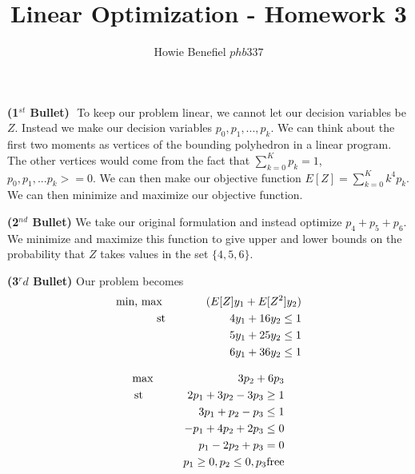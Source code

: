\documentclass[12pt]{article}
\newenvironment{problem}[2][Problem]{\begin{trivlist}
\item[\hskip \labelsep {\bfseries #1}\hskip \labelsep {\bfseries #2.}]}{\end{trivlist}}
\newenvironment{subproblem}[1]{\textbf{(#1)}}{}
\theoremstyle{definition}
\begin{document}

\title{Linear Optimization - Homework 3}
\author{Howie Benefiel \(phb337\)}
\maketitle

\begin{problem}{1}

\begin{subproblem}{1$^{st}$ Bullet}
$ $ \newline
To keep our problem linear, we cannot let our decision variables be  $Z$.
Instead we make our decision variables $p_0, p_1,...,p_k$.
We can think about the first two moments as vertices of the bounding polyhedron in a linear program.
The other vertices would come from the fact that $\sum^K_{k=0} p_k=1$, $p_0, p_1,...p_k >= 0$.
We can then make our objective function $E[Z]=\sum^K_{k=0} k^4p_k$.
We can then minimize and maximize our objective function.
\end{subproblem}

\begin{subproblem}{2$^{nd}$ Bullet}
We take our original formulation and instead optimize $p_4 + p_5 + p_6$.
We minimize and maximize this function to give upper and lower bounds on the probability that $Z$ takes values in the set $\{4,5,6\}$.
\end{subproblem}

\begin{subproblem}{3$^rd$ Bullet}
Our problem becomes
\begin{align*}
\text{min, max \hspace{0.5in}}(E[Z]y_1 + E[Z^2]y_2) \\
\text{st \hspace{0.75in}} 4y_1+16y_2 \leq 1 \\
5y_1 + 25y_2 \leq 1 \\
6y_1 + 36y_2 \leq 1
\end{align*}
\end{subproblem}

\end{problem}


\begin{problem}{2}
\begin{align*}
\text{max \hspace{1in}} 3p_2+6p_3 \\
\text{st \hspace{0.5in}} 2p_1+3p_2-3p_3 \geq 1 \\
3p_1+p_2-p_3 \leq 1 \\
-p_1+4p_2+2p_3 \leq 0 \\
p_1-2p_2+p_3=0 \\
p_1 \geq 0, p_2\leq0, p_3 \text{free}
\end{align*}
\end{problem}
\end{document}
